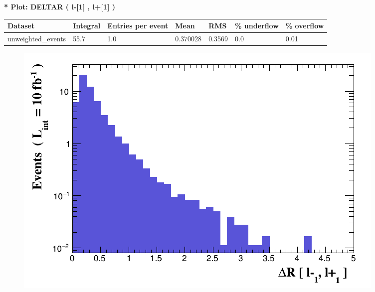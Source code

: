 \documentclass[a4paper, 10pt]{article}
\begin{document}
\textbf{* Plot: DELTAR ( l-[1] , l+[1] ) }\\
   \begin{table}[H]
  \begin{center}
    \begin{tabular}{|m{23.0mm}|m{23.0mm}|m{18.0mm}|m{19.0mm}|m{19.0mm}|m{19.0mm}|m{19.0mm}|}
      \hline
      {\cellcolor{yellow}         Dataset}& {\cellcolor{yellow}         Integral}& {\cellcolor{yellow}         Entries per event}& {\cellcolor{yellow}         Mean}& {\cellcolor{yellow}         RMS}& {\cellcolor{yellow}         \% underflow}& {\cellcolor{yellow}         \% overflow}\\
      \hline
      {\cellcolor{white}         unweighted\_events}& {\cellcolor{white}         55.7}& {\cellcolor{white}         1.0}& {\cellcolor{white}         0.370028}& {\cellcolor{white}         0.3569}& {\cellcolor{green}         0.0}& {\cellcolor{green}         0.01}\\
\hline
    \end{tabular}
  \end{center}
\end{table}

\begin{figure}[H]
  \begin{center}
    \includegraphics[scale=0.45]{selection_21.png}\\
\caption{   }
  \end{center}
\end{figure}
      
\end{document}
